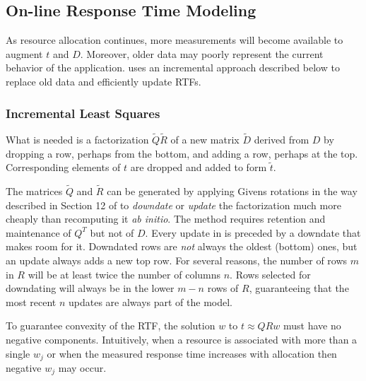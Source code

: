 \subsection{On-line Response Time Modeling}
As resource allocation continues, more measurements will become available to augment $t$ and $D$.
Moreover, older data may poorly represent the current behavior of the application.
\pacora uses an incremental approach described below to replace old data and efficiently update RTFs.

\subsubsection{Incremental Least Squares}
What is needed is a factorization $\tilde{Q}\tilde{R}$ of a new matrix $\tilde{D}$
derived from $D$ by dropping a row, perhaps from the bottom,
and adding a row, perhaps at the top.
Corresponding elements of $t$ are dropped and added to form $\tilde{t}$.

The matrices $\tilde{Q}$ and $\tilde{R}$ can be generated by applying Givens rotations
in the way described in Section 12 of \cite{GoVL} to \emph{downdate} or \emph{update} the factorization
much more cheaply than recomputing it \emph{ab initio}.
The method requires retention and maintenance of $Q^T$ but not of $D$.
Every update in \pacora is preceded by a downdate that makes room for it.
Downdated rows are \emph{not} always the oldest (bottom) ones, but
an update always adds a new top row.
For several reasons, the number of rows $m$ in $R$
will be at least twice the number of columns $n$.
Rows selected for downdating will always be in the lower $m - n$ rows of $R$,
guaranteeing that the most recent $n$ updates are always part of the model.


To guarantee convexity of the RTF, the solution $w$ to $t \approx QRw$ must have no negative components.
Intuitively, when a resource is associated with more than a single $w_j$
or when the measured response time increases with allocation then negative $w_j$ may occur.

